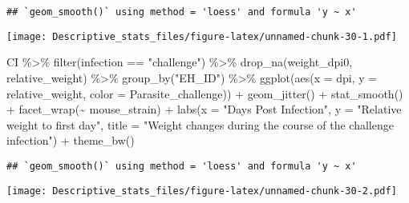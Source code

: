 \documentclass[
]{article}
\newenvironment{Shaded}{\begin{snugshade}}{\end{snugshade}}
\newcommand{\AttributeTok}[1]{\textcolor[rgb]{0.77,0.63,0.00}{#1}}
\newcommand{\FunctionTok}[1]{\textcolor[rgb]{0.00,0.00,0.00}{#1}}
\newcommand{\NormalTok}[1]{#1}
\newcommand{\SpecialCharTok}[1]{\textcolor[rgb]{0.00,0.00,0.00}{#1}}
\newcommand{\StringTok}[1]{\textcolor[rgb]{0.31,0.60,0.02}{#1}}
\begin{document}
\begin{verbatim}
## `geom_smooth()` using method = 'loess' and formula 'y ~ x'
\end{verbatim}

\texttt{[image: Descriptive\_stats\_files/figure-latex/unnamed-chunk-30-1.pdf]}

\begin{Shaded}
\begin{Highlighting}[]
\NormalTok{CI }\SpecialCharTok{\%\textgreater{}\%} 
    \FunctionTok{filter}\NormalTok{(infection }\SpecialCharTok{==} \StringTok{"challenge"}\NormalTok{) }\SpecialCharTok{\%\textgreater{}\%}
    \FunctionTok{drop\_na}\NormalTok{(weight\_dpi0, relative\_weight) }\SpecialCharTok{\%\textgreater{}\%}
    \FunctionTok{group\_by}\NormalTok{(}\StringTok{"EH\_ID"}\NormalTok{) }\SpecialCharTok{\%\textgreater{}\%}
    \FunctionTok{ggplot}\NormalTok{(}\FunctionTok{aes}\NormalTok{(}\AttributeTok{x =}\NormalTok{ dpi, }\AttributeTok{y =}\NormalTok{ relative\_weight, }\AttributeTok{color =}\NormalTok{ Parasite\_challenge)) }\SpecialCharTok{+}
    \FunctionTok{geom\_jitter}\NormalTok{() }\SpecialCharTok{+}
    \FunctionTok{stat\_smooth}\NormalTok{() }\SpecialCharTok{+}
    \FunctionTok{facet\_wrap}\NormalTok{(}\SpecialCharTok{\textasciitilde{}}\NormalTok{ mouse\_strain) }\SpecialCharTok{+}
    \FunctionTok{labs}\NormalTok{(}\AttributeTok{x =} \StringTok{"Days Post Infection"}\NormalTok{, }\AttributeTok{y =} \StringTok{"Relative weight to first day"}\NormalTok{,}
         \AttributeTok{title =} \StringTok{"Weight changes during the course of the challenge infection"}\NormalTok{) }\SpecialCharTok{+}
    \FunctionTok{theme\_bw}\NormalTok{()}
\end{Highlighting}
\end{Shaded}

\begin{verbatim}
## `geom_smooth()` using method = 'loess' and formula 'y ~ x'
\end{verbatim}

\texttt{[image: Descriptive\_stats\_files/figure-latex/unnamed-chunk-30-2.pdf]}
\end{document}
